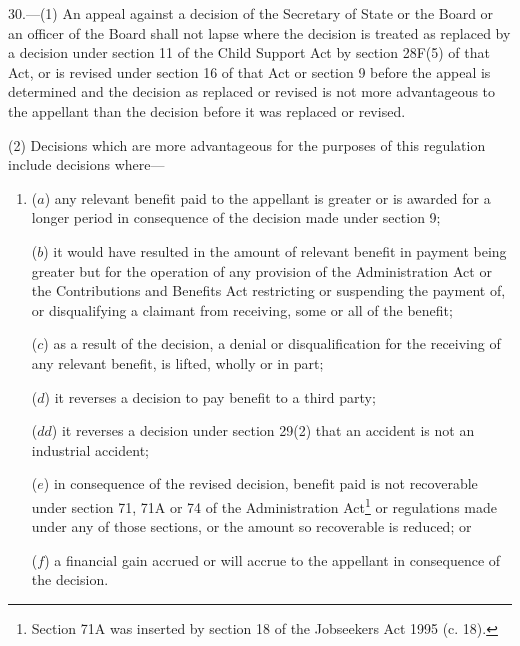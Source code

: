 \documentclass[12pt,a4paper]{article}
\begin{document}
30.—(1) An appeal against a decision of the Secretary of State
or the Board or an officer of the Board  %
shall not lapse where the decision 
is treated as replaced by a decision under section 11 of the Child Support Act by section 28F(5) of that Act, or is revised under section 16 of that Act  %
or section 9 before the appeal is determined and the decision as 
replaced or  %
revised is not more advantageous to the appellant than the decision before it was 
replaced or  %
revised.

(2) Decisions which are more advantageous for the purposes of this regulation include decisions where—
\begin{enumerate}\item[]
($a$) any relevant benefit paid to the appellant is greater or is awarded for a longer period in consequence of the decision made under section 9;

($b$) it would have resulted in the amount of relevant benefit in payment being greater but for the operation of any provision of the Administration Act or the Contributions and Benefits Act restricting or suspending the payment of, or disqualifying a claimant from receiving, some or all of the benefit;

($c$) as a result of the decision, a denial or disqualification for the receiving of any relevant benefit, is lifted, wholly or in part;

($d$) it reverses a decision to pay benefit to a third party;

($dd$) it reverses a decision under section 29(2) that an accident is not an industrial accident;

($e$) in consequence of the revised decision, benefit paid is not recoverable under section 71, 71A or 74 of the Administration Act\footnote{\frenchspacing Section 71A was inserted by section 18 of the Jobseekers Act 1995 (c. 18).} or regulations made under any of those sections, or the amount so recoverable is reduced; or

($f$) a financial gain accrued or will accrue to the appellant in consequence of the decision.
\end{enumerate}
\end{document}
